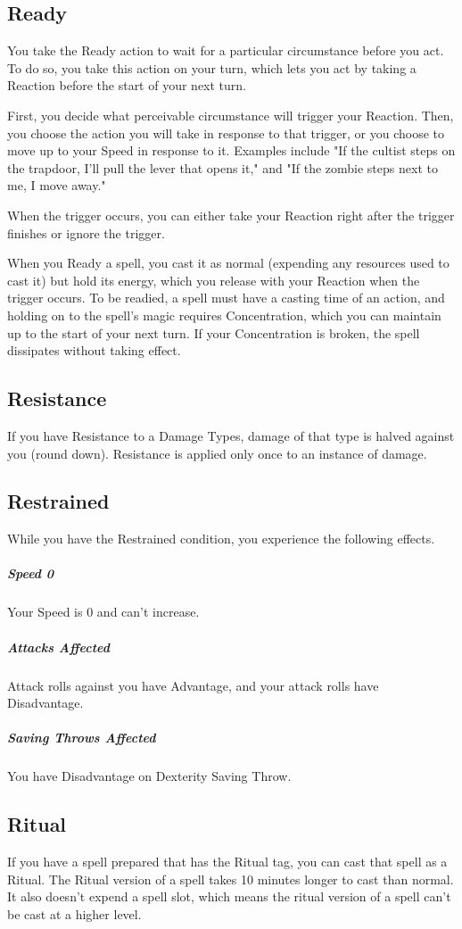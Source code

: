 \documentclass[10pt,a4paper,twoside,bg=print,twocolumn,openany,nodeprecatedcode]{dndarticle}
\begin{document}
\subsection{Ready}
You take the Ready action to wait for a particular circumstance before you act. To do so, you take this action on your turn, which lets you act by taking a Reaction before the start of your next turn.

First, you decide what perceivable circumstance will trigger your Reaction. Then, you choose the action you will take in response to that trigger, or you choose to move up to your Speed in response to it. Examples include "If the cultist steps on the trapdoor, I'll pull the lever that opens it," and "If the zombie steps next to me, I move away."

When the trigger occurs, you can either take your Reaction right after the trigger finishes or ignore the trigger.

When you Ready a spell, you cast it as normal (expending any resources used to cast it) but hold its energy, which you release with your Reaction when the trigger occurs. To be readied, a spell must have a casting time of an action, and holding on to the spell's magic requires Concentration, which you can maintain up to the start of your next turn. If your Concentration is broken, the spell dissipates without taking effect.

\subsection{Resistance}
If you have Resistance to a Damage Types, damage of that type is halved against you (round down). Resistance is applied only once to an instance of damage.

\subsection{Restrained}
While you have the Restrained condition, you experience the following effects.

\subparagraph{Speed 0}
Your Speed is 0 and can't increase.

\subparagraph{Attacks Affected}
Attack rolls against you have Advantage, and your attack rolls have Disadvantage.

\subparagraph{Saving Throws Affected}
You have Disadvantage on Dexterity Saving Throw.

\subsection{Ritual}
If you have a spell prepared that has the Ritual tag, you can cast that spell as a Ritual. The Ritual version of a spell takes 10 minutes longer to cast than normal. It also doesn't expend a spell slot, which means the ritual version of a spell can't be cast at a higher level.
\end{document}
